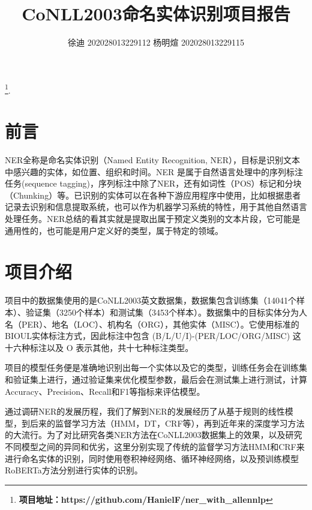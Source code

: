 \documentclass[a4paper, 12pt]{article}
\begin{document}
\title{CoNLL2003命名实体识别项目报告}


\author{徐迪 202028013229112 杨明煊 202028013229115}

\maketitle

\thispagestyle{fancy} %
\footnote{\noindent \textbf{项目地址：https://github.com/HanielF/ner\_with\_allennlp}}.

\section{前言} %
\label{sec:intro}
NER全称是命名实体识别（Named Entity Recognition, NER），目标是识别文本中感兴趣的实体，如位置、组织和时间。NER 是属于自然语言处理中的序列标注任务(sequence tagging)，序列标注中除了NER，还有如词性（POS）标记和分块（Chunking）等。已识别的实体可以在各种下游应用程序中使用，比如根据患者记录去识别和信息提取系统，也可以作为机器学习系统的特性，用于其他自然语言处理任务。NER总结的看其实就是提取出属于预定义类别的文本片段，它可能是通用性的，也可能是用户定义好的类型，属于特定的领域。

\section{项目介绍} %
\label{sec:project}
项目中的数据集使用的是CoNLL2003英文数据集，数据集包含训练集（14041个样本）、验证集（3250个样本）和测试集（3453个样本）。数据集中的目标实体分为人名（PER）、地名（LOC）、机构名（ORG），其他实体（MISC）。它使用标准的BIOUL实体标注方式，因此标注中包含 (B/L/U/I)-(PER/LOC/ORG/MISC) 这十六种标注以及 O 表示其他，共十七种标注类型。

项目的模型任务便是准确地识别出每一个实体以及它的类型，训练任务会在训练集和验证集上进行，通过验证集来优化模型参数，最后会在测试集上进行测试，计算Accuracy、Precision、Recall和F1等指标来评估模型。

通过调研NER的发展历程，我们了解到NER的发展经历了从基于规则的线性模型，到后来的监督学习方法（HMM，DT，CRF等），再到近年来的深度学习方法的大流行。为了对比研究各类NER方法在CoNLL2003数据集上的效果，以及研究不同模型之间的异同和优劣，这里分别实现了传统的监督学习方法HMM和CRF来进行命名实体的识别，同时使用卷积神经网络、循环神经网络，以及预训练模型RoBERTa方法分别进行实体的识别。
\end{document}
